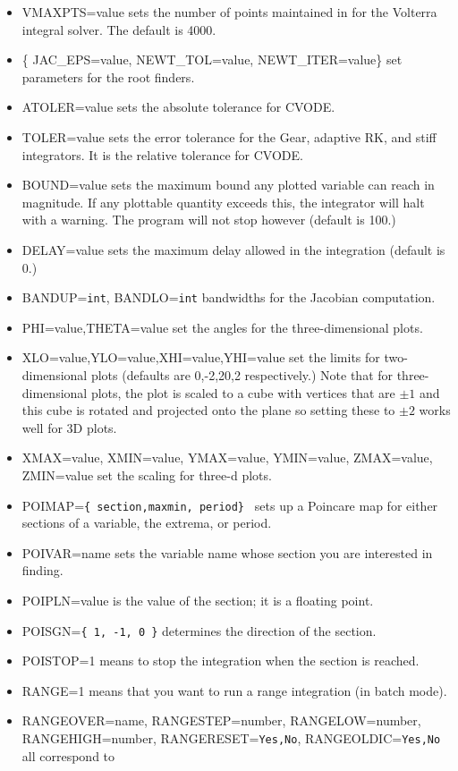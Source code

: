 \begin{itemize}
\item VMAXPTS=value sets the number of points maintained in for the
Volterra integral solver. The default is 4000.
\item \{ JAC\_EPS=value, NEWT\_TOL=value, NEWT\_ITER=value\} set
parameters for the root finders.
\item ATOLER=value sets the absolute tolerance for CVODE.
\item TOLER=value sets the error tolerance for the Gear, adaptive RK,
and stiff integrators. It is the relative tolerance for CVODE. 
\item BOUND=value sets the maximum bound any plotted variable can
reach in magnitude. If any plottable quantity exceeds this, the
integrator will halt with a warning.  The program will not stop
however (default is 100.)
\item DELAY=value sets the maximum delay allowed in the integration
(default is 0.)
\item BANDUP={\tt int}, BANDLO={\tt int} bandwidths for the Jacobian computation. 
\item PHI=value,THETA=value set the angles for the three-dimensional
plots.
\item XLO=value,YLO=value,XHI=value,YHI=value set the limits for
two-dimensional plots (defaults are 0,-2,20,2 respectively.) Note that
for three-dimensional plots, the plot is scaled to a cube with
vertices that are $\pm1$ and this cube is rotated and projected onto
the plane so setting these to $\pm2$ works well for 3D plots.
\item
XMAX=value, XMIN=value, YMAX=value, YMIN=value, ZMAX=value, ZMIN=value set
the scaling for three-d plots.
\item POIMAP={\tt \{ section,maxmin, period\} } sets up a Poincare map for
either sections of a variable, the extrema, or period.  
\item POIVAR=name sets the variable name whose section you are
interested in finding.
\item POIPLN=value is the value of the section; it is a floating
point.
\item POISGN={\tt \{ 1, -1, 0 \}} determines the direction of the
section.  
\item POISTOP=1 means to stop the integration when the section is
reached.
\item RANGE=1 means that you want to run a range integration (in batch
mode). 
\item RANGEOVER=name, RANGESTEP=number, RANGELOW=number, RANGEHIGH=number,
  RANGERESET={\tt Yes,No}, RANGEOLDIC={\tt Yes,No} all correspond to 

\end{itemize}
